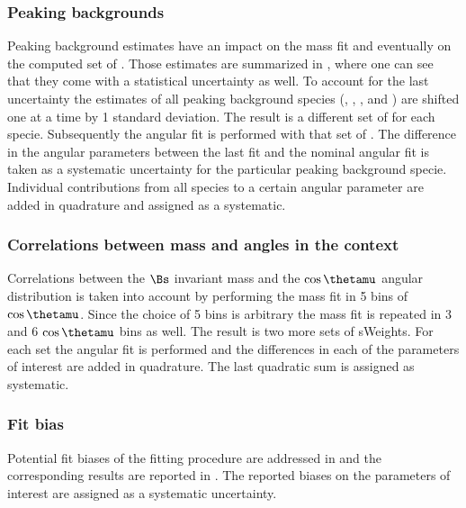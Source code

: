 \subsubsection{Peaking backgrounds}
\label{systPeakBkg}
Peaking background estimates have an impact on the mass fit and eventually on the computed set of \sWeights.
Those estimates are summarized in , where one can see that they come with a statistical uncertainty as well.
To account for the last uncertainty  the estimates of all peaking background species (\BsJpsiKK, \BsJpsipipi, \BdJpsipipi, and \LbJpsipK)
are shifted one at a time by 1 standard deviation. The result is a different set of \sWeights for each specie.
Subsequently the angular fit is performed with that set of \sWeights. The difference in the angular parameters
between the last fit and the nominal angular fit is taken as a systematic uncertainty for the particular peaking background specie.
Individual contributions from all species to a certain angular parameter are added in quadrature and assigned as a systematic.

\subsubsection{Correlations between mass and angles in the \sPlot context}
\label{systCorrs}
Correlations between the $\Bs$ invariant mass and the $\cos\thetamu$ angular distribution is taken into account
by performing the mass fit in 5 bins of $\cos\thetamu$. Since the choice of 5 bins is arbitrary the mass fit is
repeated in 3 and 6 $\cos\thetamu$ bins as well. The result is two more sets of sWeights. For each set the angular
fit is performed and the differences in each of the parameters of interest are added in quadrature. The last quadratic
sum is assigned as systematic. 

\subsubsection{Fit bias}
\label{systFitBias}
Potential fit biases of the fitting procedure are addressed in  and the corresponding 
results are reported in . The reported biases on the parameters of interest are assigned as a systematic uncertainty.

